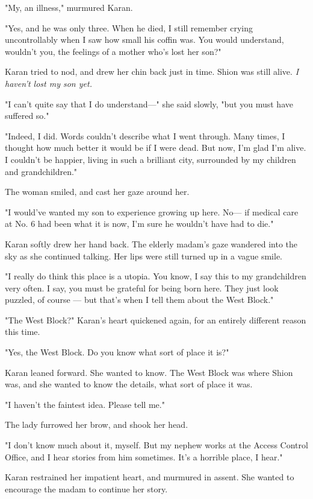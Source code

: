 "My, an illness," murmured Karan.

"Yes, and he was only three. When he died, I still remember crying
uncontrollably when I saw how small his coffin was. You would
understand, wouldn't you, the feelings of a mother who's lost her son?"

Karan tried to nod, and drew her chin back just in time. Shion was still
alive. \emph{I haven't lost my son yet.}

"I can't quite say that I do understand---" she said slowly, "but you must
have suffered so."

"Indeed, I did. Words couldn't describe what I went through. Many times,
I thought how much better it would be if I were dead. But now, I'm glad
I'm alive. I couldn't be happier, living in such a brilliant city,
surrounded by my children and grandchildren."

The woman smiled, and cast her gaze around her.

"I would've wanted my son to experience growing up here. No--- if medical
care at No. 6 had been what it is now, I'm sure he wouldn't have had to
die."

Karan softly drew her hand back. The elderly madam's gaze wandered into
the sky as she continued talking. Her lips were still turned up in a
vague smile.

"I really do think this place is a utopia. You know, I say this to my
grandchildren very often. I say, you must be grateful for being born
here. They just look puzzled, of course --- but that's when I tell them
about the West Block."

"The West Block?" Karan's heart quickened again, for an entirely
different reason this time.

"Yes, the West Block. Do you know what sort of place it is?"

Karan leaned forward. She wanted to know. The West Block was where Shion
was, and she wanted to know the details, what sort of place it was.

"I haven't the faintest idea. Please tell me."

The lady furrowed her brow, and shook her head.

"I don't know much about it, myself. But my nephew works at the Access
Control Office, and I hear stories from him sometimes. It's a horrible
place, I hear."

Karan restrained her impatient heart, and murmured in assent. She wanted
to encourage the madam to continue her story.

